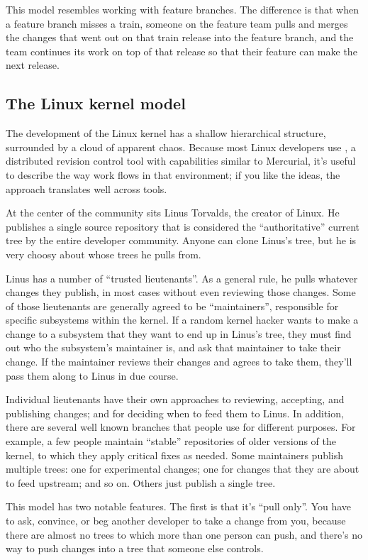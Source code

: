 This model resembles working with feature branches.  The difference is
that when a feature branch misses a train, someone on the feature team
pulls and merges the changes that went out on that train release into
the feature branch, and the team continues its work on top of that
release so that their feature can make the next release.

\subsection{The Linux kernel model}

The development of the Linux kernel has a shallow hierarchical
structure, surrounded by a cloud of apparent chaos.  Because most
Linux developers use , a distributed revision control
tool with capabilities similar to Mercurial, it's useful to describe
the way work flows in that environment; if you like the ideas, the
approach translates well across tools.

At the center of the community sits Linus Torvalds, the creator of
Linux.  He publishes a single source repository that is considered the
``authoritative'' current tree by the entire developer community.
Anyone can clone Linus's tree, but he is very choosy about whose trees
he pulls from.

Linus has a number of ``trusted lieutenants''.  As a general rule, he
pulls whatever changes they publish, in most cases without even
reviewing those changes.  Some of those lieutenants are generally
agreed to be ``maintainers'', responsible for specific subsystems
within the kernel.  If a random kernel hacker wants to make a change
to a subsystem that they want to end up in Linus's tree, they must
find out who the subsystem's maintainer is, and ask that maintainer to
take their change.  If the maintainer reviews their changes and agrees
to take them, they'll pass them along to Linus in due course.

Individual lieutenants have their own approaches to reviewing,
accepting, and publishing changes; and for deciding when to feed them
to Linus.  In addition, there are several well known branches that
people use for different purposes.  For example, a few people maintain
``stable'' repositories of older versions of the kernel, to which they
apply critical fixes as needed.  Some maintainers publish multiple
trees: one for experimental changes; one for changes that they are
about to feed upstream; and so on.  Others just publish a single
tree.

This model has two notable features.  The first is that it's ``pull
only''.  You have to ask, convince, or beg another developer to take a
change from you, because there are almost no trees to which more than
one person can push, and there's no way to push changes into a tree
that someone else controls.

